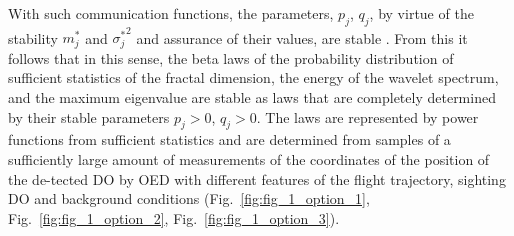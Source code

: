 With such communication functions, the parameters, $p_j$, $q_j$, by virtue of the stability $m_{j}^{*}$ and ${\sigma_{j}^{*}}^2$ and assurance of their values, are stable \cite{bib_16}.
From this it follows that in this sense, the beta laws of the probability distribution of sufficient statistics of the fractal dimension, the energy of the wavelet spectrum, and the maximum eigenvalue are stable as laws that are completely determined by their stable parameters $p_j > 0$, $q_j > 0$.
The laws are represented by power functions from sufficient statistics and are determined from samples of a sufficiently large amount of measurements of the coordinates of the position of the de-tected DO by OED with different features of the flight trajectory, sighting DO and background conditions (Fig.~\ref{fig:fig_1_option_1}, Fig.~\ref{fig:fig_1_option_2}, Fig.~\ref{fig:fig_1_option_3}).
